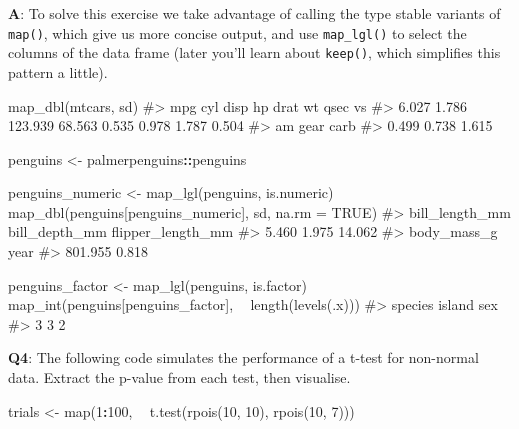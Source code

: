 \documentclass[
]{krantz}
\makeatletter
\newenvironment{Shaded}{\begin{snugshade}}{\end{snugshade}}
\newcommand{\CommentTok}[1]{\textcolor[rgb]{0.56,0.35,0.01}{\textit{#1}}}
\newcommand{\DataTypeTok}[1]{\textcolor[rgb]{0.13,0.29,0.53}{#1}}
\newcommand{\DecValTok}[1]{\textcolor[rgb]{0.00,0.00,0.81}{#1}}
\newcommand{\KeywordTok}[1]{\textcolor[rgb]{0.13,0.29,0.53}{\textbf{#1}}}
\newcommand{\NormalTok}[1]{#1}
\newcommand{\OperatorTok}[1]{\textcolor[rgb]{0.81,0.36,0.00}{\textbf{#1}}}
\newcommand{\OtherTok}[1]{\textcolor[rgb]{0.56,0.35,0.01}{#1}}
\newcommand{\StringTok}[1]{\textcolor[rgb]{0.31,0.60,0.02}{#1}}
\newenvironment{kframe}{%
\medskip{}
\setlength{\fboxsep}{.8em}
 \def\at@end@of@kframe{}%
 \ifinner\ifhmode%
  \def\at@end@of@kframe{\end{minipage}}%
  \begin{minipage}{\columnwidth}%
 \fi\fi%
 \def\FrameCommand##1{\hskip\@totalleftmargin \hskip-\fboxsep
 \colorbox{shadecolor}{##1}\hskip-\fboxsep
     \hskip-\linewidth \hskip-\@totalleftmargin \hskip\columnwidth}%
 \MakeFramed {\advance\hsize-\width
   \@totalleftmargin\z@ \linewidth\hsize
   \@setminipage}}%
 {\par\unskip\endMakeFramed%
 \at@end@of@kframe}
\renewenvironment{Shaded}{\begin{kframe}}{\end{kframe}}
\renewcommand{\KeywordTok} [1]{\textcolor[rgb]{0.00,0.44,0.13}{{#1}}}
\renewcommand{\DataTypeTok}[1]{\textcolor[rgb]{0.56,0.13,0.00}{{#1}}}
\renewcommand{\DecValTok}  [1]{\textcolor[rgb]{0.25,0.63,0.44}{{#1}}}
\renewcommand{\StringTok}  [1]{\textcolor[rgb]{0.25,0.44,0.63}{{#1}}}
\renewcommand{\CommentTok} [1]{\textcolor[rgb]{0.38,0.63,0.69}{{#1}}}
\renewcommand{\OtherTok}   [1]{\textcolor[rgb]{0.00,0.44,0.13}{{#1}}}
\renewcommand{\NormalTok}  [1]{{#1}}
\makeatother
\begin{document}
\textbf{{A}}: To solve this exercise we take advantage of calling the type stable variants of \texttt{map()}, which give us more concise output, and use \texttt{map\_lgl()} to select the columns of the data frame (later you'll learn about \texttt{keep()}, which simplifies this pattern a little).

\begin{Shaded}
\begin{Highlighting}[]
\KeywordTok{map_dbl}\NormalTok{(mtcars, sd)}
\CommentTok{#>     mpg     cyl    disp      hp    drat      wt    qsec      vs }
\CommentTok{#>   6.027   1.786 123.939  68.563   0.535   0.978   1.787   0.504 }
\CommentTok{#>      am    gear    carb }
\CommentTok{#>   0.499   0.738   1.615}

\NormalTok{penguins <-}\StringTok{ }\NormalTok{palmerpenguins}\OperatorTok{::}\NormalTok{penguins}

\NormalTok{penguins_numeric <-}\StringTok{ }\KeywordTok{map_lgl}\NormalTok{(penguins, is.numeric)}
\KeywordTok{map_dbl}\NormalTok{(penguins[penguins_numeric], sd, }\DataTypeTok{na.rm =} \OtherTok{TRUE}\NormalTok{)}
\CommentTok{#>    bill_length_mm     bill_depth_mm flipper_length_mm }
\CommentTok{#>             5.460             1.975            14.062 }
\CommentTok{#>       body_mass_g              year }
\CommentTok{#>           801.955             0.818}

\NormalTok{penguins_factor <-}\StringTok{ }\KeywordTok{map_lgl}\NormalTok{(penguins, is.factor)}
\KeywordTok{map_int}\NormalTok{(penguins[penguins_factor], }\OperatorTok{~}\StringTok{ }\KeywordTok{length}\NormalTok{(}\KeywordTok{levels}\NormalTok{(.x)))}
\CommentTok{#> species  island     sex }
\CommentTok{#>       3       3       2}
\end{Highlighting}
\end{Shaded}

\textbf{{Q4}}: The following code simulates the performance of a t-test for non-normal data. Extract the p-value from each test, then visualise.

\begin{Shaded}
\begin{Highlighting}[]
\NormalTok{trials <-}\StringTok{ }\KeywordTok{map}\NormalTok{(}\DecValTok{1}\OperatorTok{:}\DecValTok{100}\NormalTok{, }\OperatorTok{~}\StringTok{ }\KeywordTok{t.test}\NormalTok{(}\KeywordTok{rpois}\NormalTok{(}\DecValTok{10}\NormalTok{, }\DecValTok{10}\NormalTok{), }\KeywordTok{rpois}\NormalTok{(}\DecValTok{10}\NormalTok{, }\DecValTok{7}\NormalTok{)))}
\end{Highlighting}
\end{Shaded}
\end{document}
